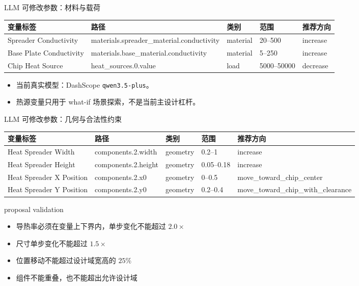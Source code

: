 \documentclass[aspectratio=169]{ctexbeamer}
\begin{document}
\begin{frame}{LLM 可修改参数：材料与载荷}
\scriptsize
\begin{tabularx}{\linewidth}{l X l l l}
\toprule
变量标签 & 路径 & 类别 & 范围 & 推荐方向 \\
\midrule
Spreader Conductivity & materials.spreader\_material.conductivity & material & 20--500 & increase \\
Base Plate Conductivity & materials.base\_material.conductivity & material & 5--250 & increase \\
Chip Heat Source & heat\_sources.0.value & load & 5000--50000 & decrease \\
\bottomrule
\end{tabularx}
\vspace{0.2cm}
\begin{itemize}
\item 当前真实模型：DashScope \texttt{qwen3.5-plus}。
\item 热源变量只用于 what-if 场景探索，不是当前主设计杠杆。
\end{itemize}
\end{frame}

\begin{frame}{LLM 可修改参数：几何与合法性约束}
\scriptsize
\begin{tabularx}{\linewidth}{l X l l l}
\toprule
变量标签 & 路径 & 类别 & 范围 & 推荐方向 \\
\midrule
Heat Spreader Width & components.2.width & geometry & 0.2--1 & increase \\
Heat Spreader Height & components.2.height & geometry & 0.05--0.18 & increase \\
Heat Spreader X Position & components.2.x0 & geometry & 0--0.5 & move\_toward\_chip\_center \\
Heat Spreader Y Position & components.2.y0 & geometry & 0.2--0.4 & move\_toward\_chip\_with\_clearance \\
\bottomrule
\end{tabularx}
\vspace{0.15cm}
\begin{block}{proposal validation}
\begin{itemize}
\item 导热率必须在变量上下界内，单步变化不能超过 $2.0\times$
\item 尺寸单步变化不能超过 $1.5\times$
\item 位置移动不能超过设计域宽高的 $25\%$
\item 组件不能重叠，也不能超出允许设计域
\end{itemize}
\end{block}
\end{frame}
\end{document}
